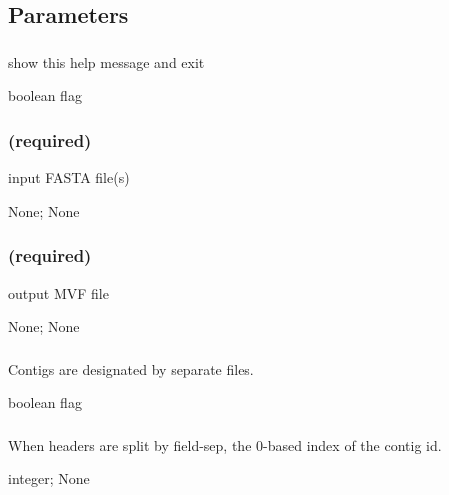 \documentclass[letterpaper,11pt,english]{sphinxmanual}
\begin{document}
\subsection{Parameters}
\label{\detokenize{prog_desc:id2}}

\subsubsection{}
\label{\detokenize{prog_desc:id3}}
 show this help message and exit

 boolean flag


\subsubsection{ (required)}
\label{\detokenize{prog_desc:fasta-required}}
 input FASTA file(s)

 None;  None


\subsubsection{ (required)}
\label{\detokenize{prog_desc:id4}}
 output MVF file

 None;  None


\subsubsection{}
\label{\detokenize{prog_desc:contig-by-file-contigbyfile}}
 Contigs are designated by separate files.

 boolean flag


\subsubsection{}
\label{\detokenize{prog_desc:contig-field-contigfield}}
 When headers are split by \textendash{}field-sep, the 0-based index of the contig id.

 integer;  None
\end{document}
